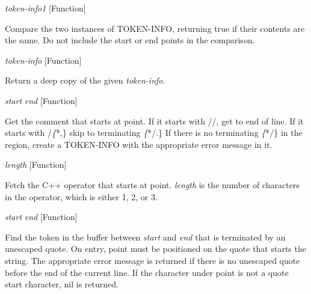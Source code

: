 \vspace{1em}
\noindent
{}
\usebox{\funcname}\emph{token-info1}
 \hfill [Function]
\hspace*{\wd\funcname}

\begin{doc-string}
Compare the two instances of TOKEN-INFO, returning true if their contents
are the same.  Do not include the start or end points in the comparison.
\end{doc-string}

\vspace{1em}
\noindent
{}
\usebox{\funcname}\emph{token-info}
 \hfill [Function]

\begin{doc-string}
Return a deep copy of the given \emph{token-info}.
\end{doc-string}

\vspace{1em}
\noindent
{}
\usebox{\funcname}\emph{start} \emph{end}
 \hfill [Function]

\begin{doc-string}
Get the comment that starts at point.  If it starts with //, get to end of
line.  If it starts with /\emph\{*,\} skip to terminating \emph\{*/.\}  If there is no terminating
\emph\{*/\} in the region, create a TOKEN-INFO with the appropriate error message in it.
\end{doc-string}

\vspace{1em}
\noindent
{}
\usebox{\funcname}\emph{length}
 \hfill [Function]

\begin{doc-string}
Fetch the C++ operator that starts at point.  \emph{length} is the number of characters
in the operator, which is either 1, 2, or 3.
\end{doc-string}

\vspace{1em}
\noindent
{}
\usebox{\funcname}\emph{start} \emph{end}
 \hfill [Function]

\begin{doc-string}
Find the token in the buffer between \emph{start} and \emph{end} that is terminated by an
unescaped quote.  On entry, point must be positioned on the quote that starts
the string.  The appropriate error message is returned if there is no unescaped
quote before the end of the current line.  If the character under point is not a
quote start character, nil is returned.
\end{doc-string}

